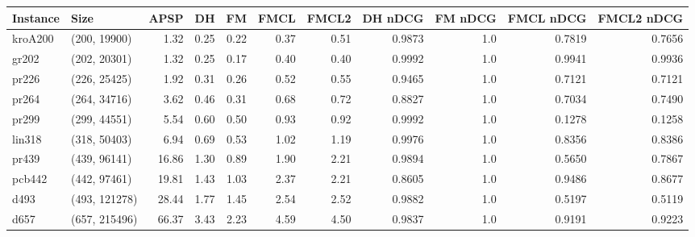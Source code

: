 \begin{tabular}{llrrrrrrrrr}
\toprule
Instance &          Size &  APSP &   DH &   FM &  FMCL &  FMCL2 &  DH nDCG &  FM nDCG &  FMCL nDCG &  FMCL2 nDCG \\
\midrule
 kroA200 &  (200, 19900) &  1.32 & 0.25 & 0.22 &  0.37 &   0.51 &   0.9873 &      1.0 &     0.7819 &      0.7656 \\
   gr202 &  (202, 20301) &  1.32 & 0.25 & 0.17 &  0.40 &   0.40 &   0.9992 &      1.0 &     0.9941 &      0.9936 \\
   pr226 &  (226, 25425) &  1.92 & 0.31 & 0.26 &  0.52 &   0.55 &   0.9465 &      1.0 &     0.7121 &      0.7121 \\
   pr264 &  (264, 34716) &  3.62 & 0.46 & 0.31 &  0.68 &   0.72 &   0.8827 &      1.0 &     0.7034 &      0.7490 \\
   pr299 &  (299, 44551) &  5.54 & 0.60 & 0.50 &  0.93 &   0.92 &   0.9992 &      1.0 &     0.1278 &      0.1258 \\
  lin318 &  (318, 50403) &  6.94 & 0.69 & 0.53 &  1.02 &   1.19 &   0.9976 &      1.0 &     0.8356 &      0.8386 \\
   pr439 &  (439, 96141) & 16.86 & 1.30 & 0.89 &  1.90 &   2.21 &   0.9894 &      1.0 &     0.5650 &      0.7867 \\
  pcb442 &  (442, 97461) & 19.81 & 1.43 & 1.03 &  2.37 &   2.21 &   0.8605 &      1.0 &     0.9486 &      0.8677 \\
    d493 & (493, 121278) & 28.44 & 1.77 & 1.45 &  2.54 &   2.52 &   0.9882 &      1.0 &     0.5197 &      0.5119 \\
    d657 & (657, 215496) & 66.37 & 3.43 & 2.23 &  4.59 &   4.50 &   0.9837 &      1.0 &     0.9191 &      0.9223 \\
\bottomrule
\end{tabular}
